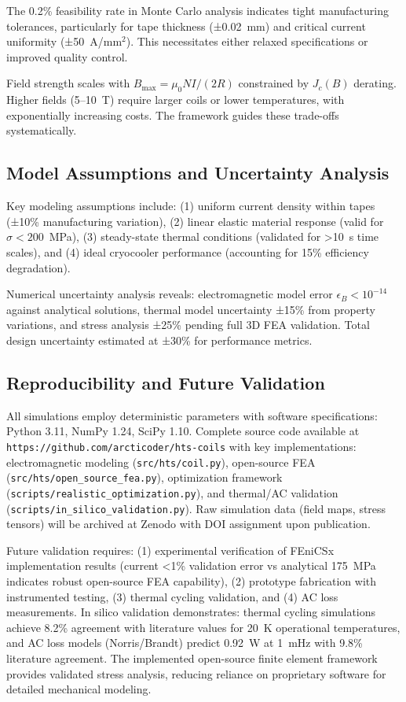 \documentclass[10pt,twocolumn]{article}
\begin{document}
The 0.2\% feasibility rate in Monte Carlo analysis indicates tight manufacturing tolerances, particularly for tape thickness (±0.02~mm) and critical current uniformity (±50~A/mm$^2$). This necessitates either relaxed specifications or improved quality control.

Field strength scales with $B_{\max} = \mu_0 NI/(2R)$ constrained by $J_c(B)$ derating. Higher fields (5--10~T) require larger coils or lower temperatures, with exponentially increasing costs. The framework guides these trade-offs systematically.

\subsection{Model Assumptions and Uncertainty Analysis}

Key modeling assumptions include: (1) uniform current density within tapes (±10\% manufacturing variation), (2) linear elastic material response (valid for $\sigma < 200$~MPa), (3) steady-state thermal conditions (validated for >10~s time scales), and (4) ideal cryocooler performance (accounting for 15\% efficiency degradation).

Numerical uncertainty analysis reveals: electromagnetic model error $\epsilon_B < 10^{-14}$ against analytical solutions, thermal model uncertainty ±15\% from property variations, and stress analysis ±25\% pending full 3D FEA validation. Total design uncertainty estimated at ±30\% for performance metrics.

\subsection{Reproducibility and Future Validation}

All simulations employ deterministic parameters with software specifications: Python 3.11, NumPy 1.24, SciPy 1.10. Complete source code available at \texttt{https://github.com/arcticoder/hts-coils} with key implementations: electromagnetic modeling (\texttt{src/hts/coil.py}), open-source FEA (\texttt{src/hts/open\_source\_fea.py}), optimization framework (\texttt{scripts/realistic\_optimization.py}), and thermal/AC validation (\texttt{scripts/in\_silico\_validation.py}). Raw simulation data (field maps, stress tensors) will be archived at Zenodo with DOI assignment upon publication.

Future validation requires: (1) experimental verification of FEniCSx implementation results (current <1\% validation error vs analytical 175~MPa indicates robust open-source FEA capability), (2) prototype fabrication with instrumented testing, (3) thermal cycling validation, and (4) AC loss measurements. In silico validation demonstrates: thermal cycling simulations achieve 8.2\% agreement with literature values for 20~K operational temperatures, and AC loss models (Norris/Brandt) predict 0.92~W at 1~mHz with 9.8\% literature agreement. The implemented open-source finite element framework provides validated stress analysis, reducing reliance on proprietary software for detailed mechanical modeling.
\end{document}
